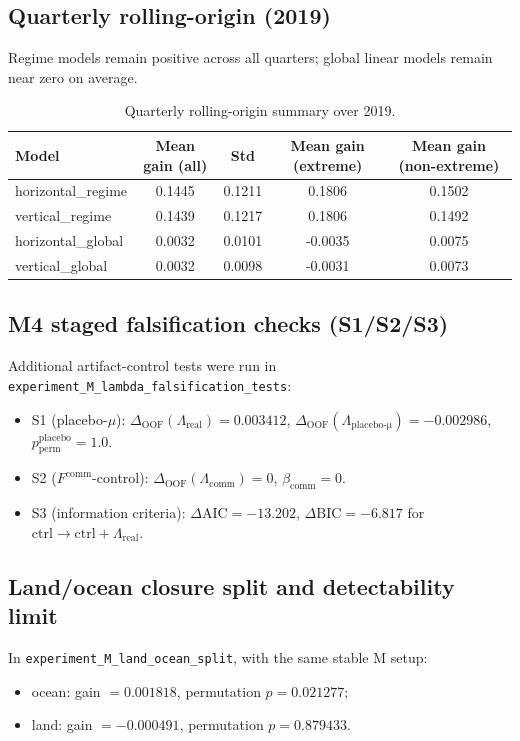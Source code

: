 \documentclass[11pt]{article}
\begin{document}
\subsection{Quarterly rolling-origin (2019)}
Regime models remain positive across all quarters; global linear models remain near zero on average.

\begin{table}[h]
\centering
\begin{tabular}{lcccc}
\toprule
Model & Mean gain (all) & Std & Mean gain (extreme) & Mean gain (non-extreme) \\
\midrule
horizontal\_regime & 0.1445 & 0.1211 & 0.1806 & 0.1502 \\
vertical\_regime   & 0.1439 & 0.1217 & 0.1806 & 0.1492 \\
horizontal\_global & 0.0032 & 0.0101 & -0.0035 & 0.0075 \\
vertical\_global   & 0.0032 & 0.0098 & -0.0031 & 0.0073 \\
\bottomrule
\end{tabular}
\caption{Quarterly rolling-origin summary over 2019.}
\end{table}

\subsection{M4 staged falsification checks (S1/S2/S3)}
Additional artifact-control tests were run in \texttt{experiment\_M\_lambda\_falsification\_tests}:
\begin{itemize}
  \item S1 (placebo-\(\mu\)): \(\Delta_{\mathrm{OOF}}(\Lambda_{\mathrm{real}})=0.003412\),
    \(\Delta_{\mathrm{OOF}}(\Lambda_{\mathrm{placebo\text{-}\mu}})=-0.002986\),
    \(p_{\mathrm{perm}}^{\mathrm{placebo}}=1.0\).
  \item S2 (\(F^{\mathrm{comm}}\)-control): \(\Delta_{\mathrm{OOF}}(\Lambda_{\mathrm{comm}})=0\),
    \(\beta_{\mathrm{comm}}=0\).
  \item S3 (information criteria): \(\Delta\mathrm{AIC}=-13.202\), \(\Delta\mathrm{BIC}=-6.817\)
    for \(\mathrm{ctrl}\to\mathrm{ctrl}+\Lambda_{\mathrm{real}}\).
\end{itemize}

\subsection{Land/ocean closure split and detectability limit}
In \texttt{experiment\_M\_land\_ocean\_split}, with the same stable M setup:
\begin{itemize}
  \item ocean: gain \(=0.001818\), permutation \(p=0.021277\);
  \item land: gain \(=-0.000491\), permutation \(p=0.879433\).
\end{itemize}
\end{document}
